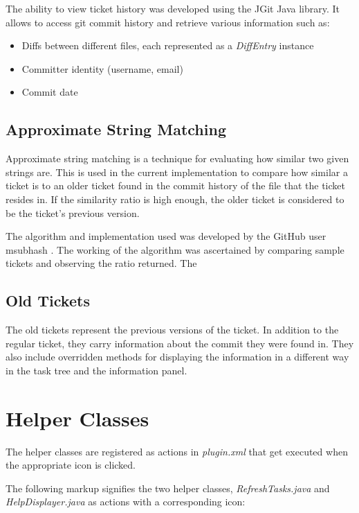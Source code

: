 \documentclass{4thYearProject}
\begin{document}
The ability to view ticket history was developed using the JGit Java library. It allows to access git commit history and retrieve various information such as:

\begin{itemize}
\item Diffs between different files, each represented as a \textit{DiffEntry} instance
\item Committer identity (username, email)
\item Commit date
\end{itemize}

\subsection{Approximate String Matching}

Approximate string matching is a technique for evaluating how similar two given strings are. This is used in the current implementation to compare how similar a ticket is to an older ticket found in the commit history of the file that the ticket resides in. If the similarity ratio is high enough, the older ticket is considered to be the ticket's previous version. 

The algorithm and implementation used was developed by the GitHub user msubhash \cite{fuzzywuzzy}. The working of the algorithm was ascertained by comparing sample tickets and observing the ratio returned. The 

\subsection{Old Tickets}

The old tickets represent the previous versions of the ticket. In addition to the regular ticket, they carry information about the commit they were found in. They also include overridden methods for displaying the information in a different way in the task tree and the information panel.

\section{Helper Classes}

The helper classes are registered as actions in \textit{plugin.xml} that get executed when the appropriate icon is clicked.

The following markup signifies the two helper classes, \textit{RefreshTasks.java} and \textit{HelpDisplayer.java} as actions with a corresponding icon:
\end{document}
